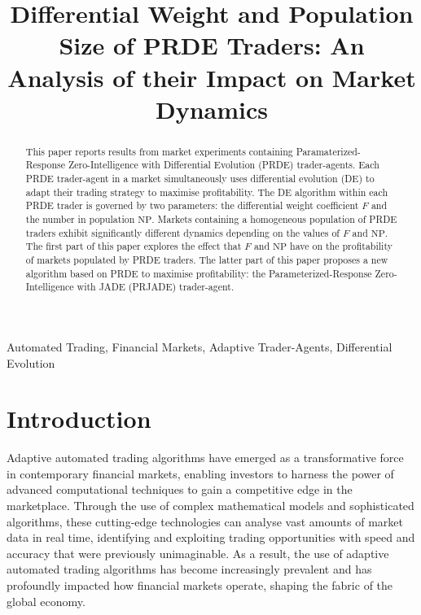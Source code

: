 \documentclass[conference]{IEEEtran}
\begin{document}
\title{Differential Weight and Population Size of PRDE Traders: An Analysis of their Impact on Market Dynamics}

\author{
}

\maketitle

\begin{abstract}
This paper reports results from market experiments containing Paramaterized-Response Zero-Intelligence with Differential Evolution (PRDE) trader-agents.
Each PRDE trader-agent in a market simultaneously uses differential evolution (DE) to adapt their trading strategy to maximise profitability.
The DE algorithm within each PRDE trader is governed by two parameters: the differential weight coefficient $F$ and the number in population $\mathrm{NP}$.
Markets containing a homogeneous population of PRDE traders exhibit significantly different dynamics depending on the values of $F$ and $\mathrm{NP}$.
The first part of this paper explores the effect that $F$ and $\mathrm{NP}$ have on the profitability of markets populated by PRDE traders.
The latter part of this paper proposes a new algorithm based on PRDE to maximise profitability: the Parameterized-Response Zero-Intelligence with JADE (PRJADE) trader-agent.

\end{abstract}

\begin{IEEEkeywords}
Automated Trading, Financial Markets, Adaptive Trader-Agents, Differential Evolution
\end{IEEEkeywords}

\section{Introduction}

Adaptive automated trading algorithms have emerged as a transformative force in contemporary financial markets, enabling investors to harness the power of advanced computational techniques to gain a competitive edge in the marketplace.
Through the use of complex mathematical models and sophisticated algorithms, these cutting-edge technologies can analyse vast amounts of market data in real time, identifying and exploiting trading opportunities with speed and accuracy that were previously unimaginable.
As a result, the use of adaptive automated trading algorithms has become increasingly prevalent and has profoundly impacted how financial markets operate, shaping the fabric of the global economy.
\end{document}
